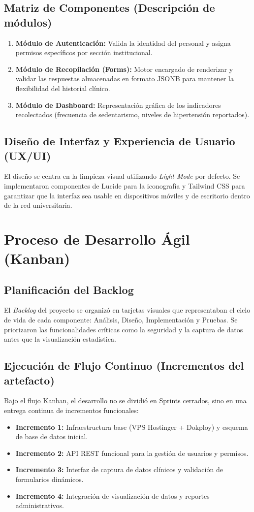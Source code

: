 \subsection{Matriz de Componentes (Descripción de módulos)}
\begin{enumerate}
    \item \textbf{Módulo de Autenticación:} Valida la identidad del personal y asigna permisos específicos por sección institucional.
    \item \textbf{Módulo de Recopilación (Forms):} Motor encargado de renderizar y validar las respuestas almacenadas en formato JSONB para mantener la flexibilidad del historial clínico.
    \item \textbf{Módulo de Dashboard:} Representación gráfica de los indicadores recolectados (frecuencia de sedentarismo, niveles de hipertensión reportados).
\end{enumerate}

\subsection{Diseño de Interfaz y Experiencia de Usuario (UX/UI)}
El diseño se centra en la limpieza visual utilizando \textit{Light Mode} por defecto. Se implementaron componentes de Lucide para la iconografía y Tailwind CSS para garantizar que la interfaz sea usable en dispositivos móviles y de escritorio dentro de la red universitaria.

\section{Proceso de Desarrollo Ágil (Kanban)}

\subsection{Planificación del Backlog}
El \textit{Backlog} del proyecto se organizó en tarjetas visuales que representaban el ciclo de vida de cada componente: Análisis, Diseño, Implementación y Pruebas. Se priorizaron las funcionalidades críticas como la seguridad y la captura de datos antes que la visualización estadística.

\subsection{Ejecución de Flujo Continuo (Incrementos del artefacto)}
Bajo el flujo Kanban, el desarrollo no se dividió en Sprints cerrados, sino en una entrega continua de incrementos funcionales:
\begin{itemize}
    \item \textbf{Incremento 1:} Infraestructura base (VPS Hostinger + Dokploy) y esquema de base de datos inicial.
    \item \textbf{Incremento 2:} API REST funcional para la gestión de usuarios y permisos.
    \item \textbf{Incremento 3:} Interfaz de captura de datos clínicos y validación de formularios dinámicos.
    \item \textbf{Incremento 4:} Integración de visualización de datos y reportes administrativos.
\end{itemize}